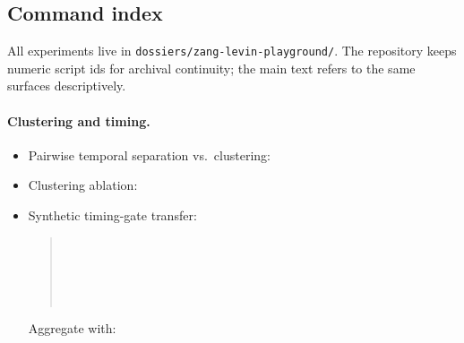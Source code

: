\documentclass[11pt]{article}
\begin{document}
\subsection{Command index}
All experiments live in \texttt{dossiers/zang-levin-playground/}. The repository keeps numeric
script ids for archival continuity; the main text refers to the same surfaces descriptively.

\paragraph{Clustering and timing.}
\begin{itemize}
  \item Pairwise temporal separation vs.\ clustering:
  \begin{quote}\small
  \texttt{}
  \end{quote}
  \item Clustering ablation:
  \begin{quote}\small
  \texttt{}
  \end{quote}
  \item Synthetic timing-gate transfer:
  \begin{quote}\small
  \texttt{}\\
  \texttt{}\\
  \texttt{}\\
  \texttt{}\\
  \texttt{}
  \end{quote}
  Aggregate with:
  \begin{quote}\small
  \texttt{}
  \end{quote}
\end{itemize}
\end{document}
